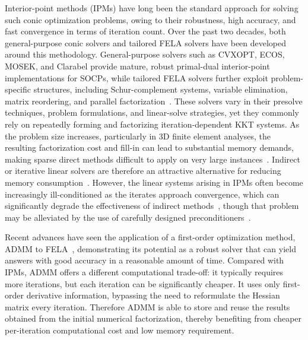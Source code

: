 Interior-point methods (IPMs) have long been the standard approach for solving such conic optimization problems, owing to their robustness, high accuracy, and fast convergence in terms of iteration count. Over the past two decades, both general-purpose conic solvers and tailored FELA solvers have been developed around this methodology. General-purpose solvers such as CVXOPT, ECOS, MOSEK, and Clarabel provide mature, robust primal-dual interior-point implementations for SOCPs, while tailored FELA solvers further exploit problem-specific structures, including Schur-complement systems, variable elimination, matrix reordering, and parallel factorization~\cite{CVXOPT, ECOS, MOSEK, Clarabel, high_performance_IPM, Podlich_2017}. These solvers vary in their presolve techniques, problem formulations, and linear-solve strategies, yet they commonly rely on repeatedly forming and factorizing iteration-dependent KKT systems. As the problem size increases, particularly in 3D finite element analyses, the resulting factorization cost and fill-in can lead to substantial memory demands, making sparse direct methods difficult to apply on very large instances~\cite{IPM25}. Indirect or iterative linear solvers are therefore an attractive alternative for reducing memory consumption~\cite{Saad_book}. However, the linear systems arising in IPMs often become increasingly ill-conditioned as the iterates approach convergence, which can significantly degrade the effectiveness of indirect methods~\cite{GeNIOS}, though that problem may be alleviated by the use of carefully designed preconditioners~\cite{Matrix_free_IPM, Gondzio_2023}.






Recent advances have seen the application of a first-order optimization method, ADMM to FELA~\cite{daSilva_2020, Antao_2021}, demonstrating its potential as a robust solver that can yield answers with good accuracy in a reasonable amount of time. Compared with IPMs, ADMM offers a different computational trade-off: it typically requires more iterations, but each iteration can be significantly cheaper. It uses only first-order derivative information, bypassing the need to reformulate the Hessian matrix every iteration. Therefore ADMM is able to store and reuse the results obtained from the initial numerical factorization, thereby benefiting from cheaper per-iteration computational cost and low memory requirement. 



